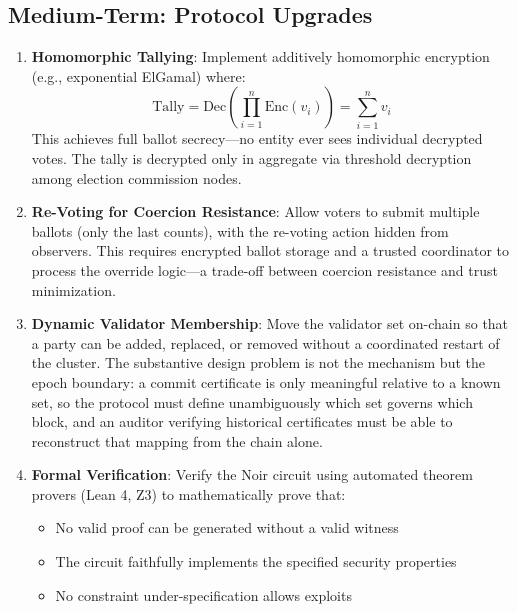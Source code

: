 \subsection{Medium-Term: Protocol Upgrades}

\begin{enumerate}
    \item \textbf{Homomorphic Tallying}: Implement additively homomorphic encryption (e.g., exponential ElGamal) where:
    \begin{equation}
    \text{Tally} = \text{Dec}\left(\prod_{i=1}^{n} \text{Enc}(v_i)\right) = \sum_{i=1}^{n} v_i
    \end{equation}
    This achieves full ballot secrecy---no entity ever sees individual decrypted votes. The tally is decrypted only in aggregate via threshold decryption among election commission nodes.
    
    \item \textbf{Re-Voting for Coercion Resistance}: Allow voters to submit multiple ballots (only the last counts), with the re-voting action hidden from observers. This requires encrypted ballot storage and a trusted coordinator to process the override logic---a trade-off between coercion resistance and trust minimization.
    
    \item \textbf{Dynamic Validator Membership}: Move the validator set on-chain so that a party can be added, replaced, or removed without a coordinated restart of the cluster. The substantive design problem is not the mechanism but the epoch boundary: a commit certificate is only meaningful relative to a known set, so the protocol must define unambiguously which set governs which block, and an auditor verifying historical certificates must be able to reconstruct that mapping from the chain alone.

    \item \textbf{Formal Verification}: Verify the Noir circuit using automated theorem provers (Lean 4, Z3) to mathematically prove that:
    \begin{itemize}
        \item No valid proof can be generated without a valid witness
        \item The circuit faithfully implements the specified security properties
        \item No constraint under-specification allows exploits
    \end{itemize}
\end{enumerate}

